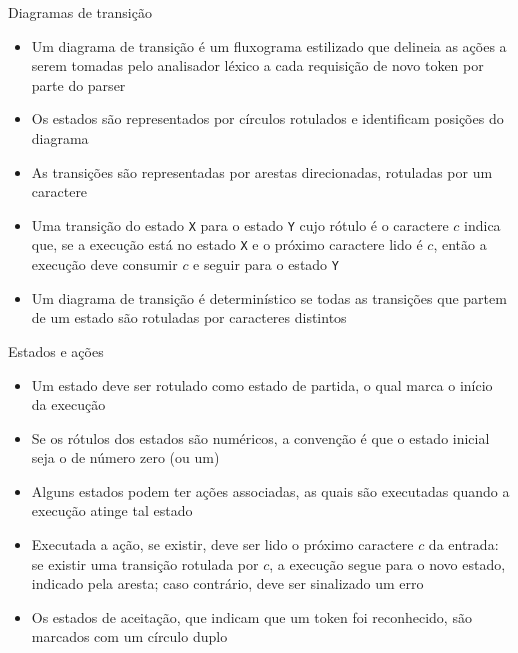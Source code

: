 \begin{frame}[fragile]{Diagramas de transição}

    \begin{itemize}
        \item Um diagrama de transição é um fluxograma estilizado que delineia as ações a serem tomadas pelo analisador léxico a cada requisição de novo token
            por parte do parser
        \pause

        \item Os estados são representados por círculos rotulados e identificam posições do diagrama 
        \pause

        \item As transições são representadas por arestas direcionadas, rotuladas por um caractere
        \pause

        \item Uma transição do estado \texttt{X} para o estado \texttt{Y} cujo rótulo é o caractere $c$ indica que, se a execução está no estado \texttt{X} e
            o próximo caractere lido é $c$, então a execução deve consumir $c$ e seguir para o estado \texttt{Y}
        \pause

        \item Um diagrama de transição é determinístico se todas as transições que partem de um estado são rotuladas por caracteres distintos
    \end{itemize}

\end{frame}

\begin{frame}[fragile]{Estados e ações}

    \begin{itemize}
        \item Um estado deve ser rotulado como estado de partida, o qual marca o início da execução
        \pause

        \item Se os rótulos dos estados são numéricos, a convenção é que o estado inicial seja o de número zero (ou um)
        \pause

        \item Alguns estados podem ter ações associadas, as quais são executadas quando a execução atinge tal estado
        \pause

        \item Executada a ação, se existir, deve ser lido o próximo caractere $c$ da entrada: se existir uma transição rotulada por $c$, a execução segue
            para o novo estado, indicado pela aresta; caso contrário, deve ser sinalizado um erro
        \pause

        \item Os estados de aceitação, que indicam que um token foi reconhecido, são marcados com um círculo duplo
    \end{itemize}

\end{frame}

